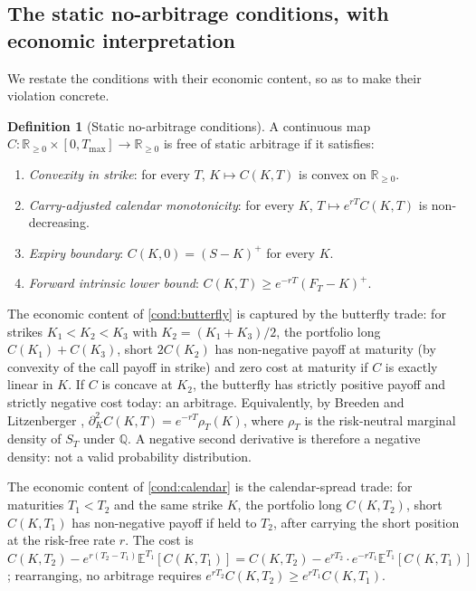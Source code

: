 \documentclass[largeformat]{interact}
\let\cite\citep   %
\theoremstyle{plain}
\theoremstyle{definition}
\newtheorem{definition}[theorem]{Definition}
\newcommand{\R}{\mathbb{R}}
\newcommand{\E}{\mathbb{E}}
\newcommand{\Qm}{\mathbb{Q}}
\begin{document}
\subsection{The static no-arbitrage conditions, with economic interpretation}
\label{sec:no-arb-conditions}

We restate the conditions with their economic content, so as to make their violation concrete.

\begin{definition}[Static no-arbitrage conditions]
\label{def:no-arb}
A continuous map $C : \R_{\geq 0} \times [0, T_{\max}] \to \R_{\geq 0}$ is free of static arbitrage if it satisfies:
\begin{enumerate}[label=(A\arabic*),leftmargin=2.8em]
\item \label{cond:butterfly}
\emph{Convexity in strike}: for every $T$, $K \mapsto C(K, T)$ is convex on $\R_{\geq 0}$.
\item \label{cond:calendar}
\emph{Carry-adjusted calendar monotonicity}: for every $K$, $T \mapsto e^{rT} C(K, T)$ is non-decreasing.
\item \label{cond:boundary-expiry}
\emph{Expiry boundary}: $C(K, 0) = (S - K)^+$ for every $K$.
\item \label{cond:intrinsic-bound}
\emph{Forward intrinsic lower bound}: $C(K, T) \geq e^{-rT}(F_T - K)^+$.
\end{enumerate}
\end{definition}

The economic content of \ref{cond:butterfly} is captured by the butterfly trade: for strikes $K_1 < K_2 < K_3$ with $K_2 = (K_1 + K_3)/2$, the portfolio long $C(K_1) + C(K_3)$, short $2 C(K_2)$ has non-negative payoff at maturity (by convexity of the call payoff in strike) and zero cost at maturity if $C$ is exactly linear in $K$. If $C$ is concave at $K_2$, the butterfly has strictly positive payoff and strictly negative cost today: an arbitrage. Equivalently, by Breeden and Litzenberger \cite{breeden1978prices}, $\partial^2_K C(K, T) = e^{-rT}\rho_T(K)$, where $\rho_T$ is the risk-neutral marginal density of $S_T$ under $\Qm$. A negative second derivative is therefore a negative density: not a valid probability distribution.

The economic content of \ref{cond:calendar} is the calendar-spread trade: for maturities $T_1 < T_2$ and the same strike $K$, the portfolio long $C(K, T_2)$, short $C(K, T_1)$ has non-negative payoff if held to $T_2$, after carrying the short position at the risk-free rate $r$. The cost is $C(K, T_2) - e^{r(T_2 - T_1)} \E^{T_1}[C(K, T_1)] = C(K, T_2) - e^{rT_2} \cdot e^{-rT_1}\E^{T_1}[C(K, T_1)]$; rearranging, no arbitrage requires $e^{rT_2}C(K, T_2) \geq e^{rT_1}C(K, T_1)$.
\end{document}
